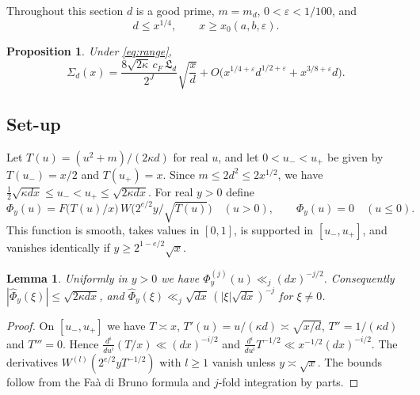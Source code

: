 \documentclass[11pt]{amsart}
\newtheorem{proposition}[theorem]{Proposition}
\newtheorem{lemma}[theorem]{Lemma}
\theoremstyle{remark}
\theoremstyle{definition}
\numberwithin{equation}{section}
\newcommand{\eps}{\varepsilon}
\newcommand{\Lf}{\mathfrak{L}}
\begin{document}
Throughout this section $d$ is a good prime, $m=m_d$, $0<\eps<1/100$, and
\begin{equation}\label{eq:range}
d\le x^{1/4},\qquad x\ge x_0(a,b,\eps).
\end{equation}

\begin{proposition}\label{prop:asymp}
Under \eqref{eq:range},
\[
\Sigma_d(x)=\frac{8\sqrt{2\kappa}\,c_F\,\Lf_d}{2^J}\sqrt{\frac xd}+O\bigl(x^{1/4+\eps}d^{1/2+\eps}+x^{3/8+\eps}d\bigr).
\]
\end{proposition}

\subsection{Set-up}
Let $T(u)=(u^2+m)/(2\kappa d)$ for real $u$, and let $0<u_-<u_+$ be given by $T(u_-)=x/2$ and $T(u_+)=x$. Since $m\le2d^2\le2x^{1/2}$, we have $\frac12\sqrt{\kappa dx}\le u_-<u_+\le\sqrt{2\kappa dx}$. For real $y>0$ define
\[
\Phi_y(u)=F\bigl(T(u)/x\bigr)\,W\bigl(2^{e/2}y/\sqrt{T(u)}\bigr)\quad(u>0),\qquad\Phi_y(u)=0\quad(u\le0).
\]
This function is smooth, takes values in $[0,1]$, is supported in $[u_-,u_+]$, and vanishes identically if $y\ge2^{1-e/2}\sqrt x$.

\begin{lemma}\label{lem:Phi}
Uniformly in $y>0$ we have $\Phi_y^{(j)}(u)\ll_j(dx)^{-j/2}$. Consequently $|\hat\Phi_y(\xi)|\le\sqrt{2\kappa dx}$, and $\hat\Phi_y(\xi)\ll_j\sqrt{dx}\,(|\xi|\sqrt{dx})^{-j}$ for $\xi\ne0$.
\end{lemma}

\begin{proof}
On $[u_-,u_+]$ we have $T\asymp x$, $T'(u)=u/(\kappa d)\asymp\sqrt{x/d}$, $T''=1/(\kappa d)$ and $T'''=0$. Hence $\frac{d^i}{du^i}(T/x)\ll(dx)^{-i/2}$ and $\frac{d^i}{du^i}T^{-1/2}\ll x^{-1/2}(dx)^{-i/2}$. The derivatives $W^{(l)}(2^{e/2}yT^{-1/2})$ with $l\ge1$ vanish unless $y\asymp\sqrt x$. The bounds follow from the Fa\`a di Bruno formula and $j$-fold integration by parts.
\end{proof}
\end{document}
